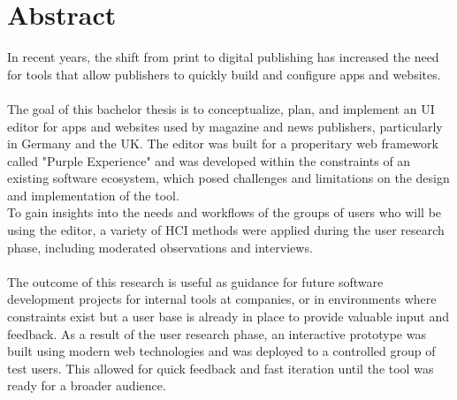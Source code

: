 %

\chapter{Abstract}

In recent years, the shift from print to digital publishing has increased the need for tools that allow publishers to quickly build and configure apps and websites.
\\\\
The goal of this bachelor thesis is to conceptualize, plan, and implement an UI editor for apps and websites used by magazine and news publishers, particularly in Germany and the UK.
The editor was built for a properitary web framework called "Purple Experience" and was developed within the constraints of an existing software ecosystem, which posed challenges and limitations on the design and implementation of the tool.
\\
To gain insights into the needs and workflows of the groups of users who will be using the editor, a variety of HCI methods were applied during the user research phase, including moderated observations and interviews. 
\\\\
The outcome of this research is useful as guidance for future software development projects for internal tools at companies, or in environments where constraints exist but a user base is already in place to provide valuable input and feedback. As a result of the user research phase, an interactive prototype was built using modern web technologies and was deployed to a controlled group of test users. This allowed for quick feedback and fast iteration until the tool was ready for a broader audience.
